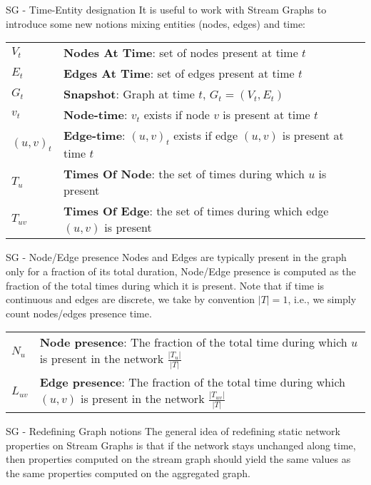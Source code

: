 \begin{textbox}{SG - Time-Entity designation}
    It is useful to work with Stream Graphs to introduce some new notions mixing entities (nodes, edges) and time:

    \begin{tabular}{p{}|p{}}\scriptsize
        $V_{t}$   & \textbf{Nodes At Time}: set of nodes present at time $t$                      \\
        $E_{t}$   & \textbf{Edges At Time}: set of edges present at time $t$                      \\
        $G_t$     & \textbf{Snapshot}: Graph at time $t$, $G_t=(V_t,E_t)$                         \\
        $v_t$     & \textbf{Node-time}: $v_t$ exists if node $v$ is present at time $t$           \\
        $(u,v)_t$ & \textbf{Edge-time}: $(u,v)_t$ exists if edge $(u,v)$ is present at time $t$   \\
        $T_u$     & \textbf{Times Of Node}: the set of times during which $u$ is present          \\
        $T_{uv}$  & \textbf{Times Of Edge}: the set of times during which edge $(u,v)$ is present \\
    \end{tabular}
\end{textbox}


\begin{textbox}{SG - Node/Edge presence}
    Nodes and Edges are typically present in the graph only for a fraction of its total duration, Node/Edge presence is computed as the fraction of the total times during which it is present. Note that if time is continuous and edges are discrete, we take by convention $|T|=1$, i.e., we simply count nodes/edges presence time.

    \begin{tabular}{p{}|p{}}\scriptsize
        $N_u$    & \textbf{Node presence}: The fraction of the total time during which $u$ is present in the network $\frac{|T_u|}{|T|}$        \\
        $L_{uv}$ & \textbf{Edge presence}: The fraction of the total time during which $(u,v)$ is present in the network $\frac{|T_{uv}|}{|T|}$ \\
    \end{tabular}
\end{textbox}


\begin{textbox}{SG - Redefining Graph notions}
    The general idea of redefining static network properties on Stream Graphs is that if the network stays unchanged along time, then properties computed on the stream graph should yield the same values as the same properties computed on the aggregated graph.
\end{textbox}


